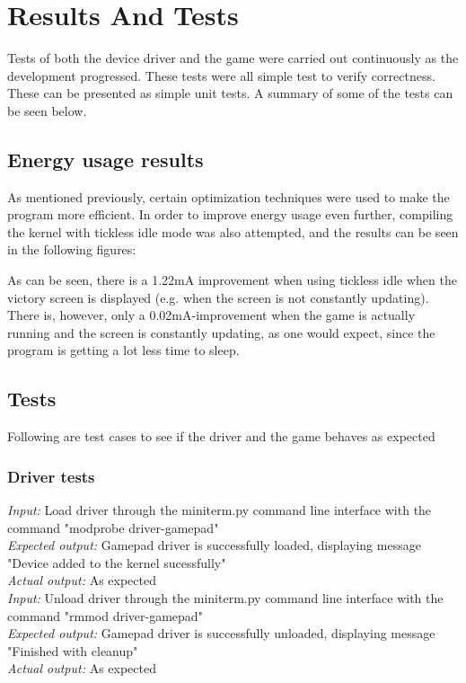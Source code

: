 \section{Results And Tests}
Tests of both the device driver and the game were carried out continuously as the development progressed. These tests were all simple test to verify correctness. These can be presented as simple unit tests. A summary of some of the tests can be seen below.

\subsection{Energy usage results}

As mentioned previously, certain optimization techniques were used to make the program more efficient. In order to improve energy usage even further, compiling the kernel with tickless idle mode was also attempted, and the results can be seen in the following figures:






As can be seen, there is a 1.22mA improvement when using tickless idle when the victory screen is displayed (e.g. when the screen is not constantly updating). There is, however, only a 0.02mA-improvement when the game is actually running and the screen is constantly updating, as one would expect, since the program is getting a lot less time to sleep.

\subsection{Tests}

Following are test cases to see if the driver and the game behaves as expected

\subsubsection{Driver tests}

\emph{Input: } Load driver through the miniterm.py command line interface with the command "modprobe driver-gamepad"\\
\emph{Expected output: } Gamepad driver is successfully loaded, displaying message "Device added to the kernel sucessfully"\\
\emph{Actual output: } As expected\\

\emph{Input: } Unload driver through the miniterm.py command line interface with the command "rmmod driver-gamepad"\\
\emph{Expected output: } Gamepad driver is successfully unloaded, displaying message "Finished with cleanup"\\
\emph{Actual output: } As expected\\

